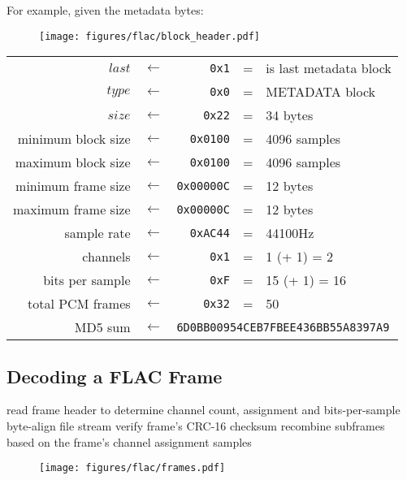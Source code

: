 \clearpage

For example, given the metadata bytes:
\begin{figure}[h]
\texttt{[image: figures/flac/block\_header.pdf]}
\end{figure}
\par
\noindent
\begin{tabular}{rcrcl}
$last$ & $\leftarrow$ & \texttt{0x1} & = & is last metadata block \\
$type$ & $\leftarrow$ & \texttt{0x0} & = & METADATA block \\
$size$ & $\leftarrow$ & \texttt{0x22} & = & 34 bytes \\
minimum block size & $\leftarrow$ & \texttt{0x0100} & = & 4096 samples \\
maximum block size & $\leftarrow$ & \texttt{0x0100} & = & 4096 samples \\
minimum frame size & $\leftarrow$ & \texttt{0x00000C} & = & 12 bytes \\
maximum frame size & $\leftarrow$ & \texttt{0x00000C} & = & 12 bytes \\
sample rate & $\leftarrow$ & \texttt{0xAC44} & = & 44100Hz \\
channels & $\leftarrow$ & \texttt{0x1} & = & 1 (+ 1) = 2 \\
bits per sample & $\leftarrow$ & \texttt{0xF} & = & 15 (+ 1) = 16 \\
total PCM frames & $\leftarrow$ & \texttt{0x32} & = & 50 \\
MD5 sum & $\leftarrow$ & \multicolumn{3}{l}{\texttt{6D0BB00954CEB7FBEE436BB55A8397A9}} \\
\end{tabular}

\clearpage

\subsection{Decoding a FLAC Frame}

read frame header to determine channel count, assignment and bits-per-sample\;
byte-align file stream\;
verify frame's CRC-16 checksum\;
recombine subframes based on the frame's channel assignment\;
\Return samples\;
\EALGORITHM
\begin{figure}[h]
\texttt{[image: figures/flac/frames.pdf]}
\end{figure}


